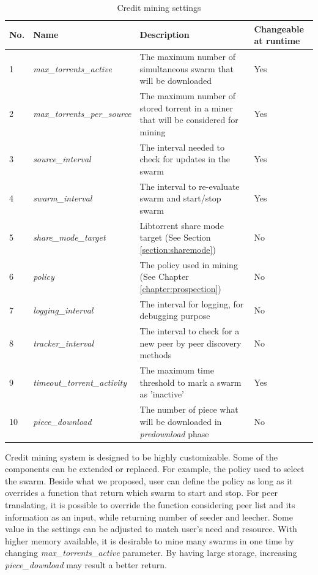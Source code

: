 \begin{table}[h]
	\centering
	\caption{Credit mining settings}
	\label{tbl:cmsettings}
	\begin{adjustwidth}{-1.5cm}{}
	\begin{tabular}{|p{1cm}|p{4cm}|p{7cm}|p{2cm}|}
		\hline
		\rowcolor[HTML]{EFEFEF} 
		No. & Name & Description & Changeable at runtime \\ \hline
	1 & \textit{max\_torrents\_active} & The maximum number of simultaneous swarm that will be downloaded & Yes \\ \hline
	2 & \textit{max\_torrents\_per\_source} & The maximum number of stored torrent in a miner that will be considered for mining & Yes \\ \hline
	3 & \textit{source\_interval} & The interval needed to check for updates in the swarm & Yes \\ \hline
	4 & \textit{swarm\_interval} & The interval to re-evaluate swarm and start/stop swarm & Yes \\ \hline
	5 & \textit{share\_mode\_target} & Libtorrent share mode target (See Section \ref{section:sharemode}) & No \\ \hline
	6 & \textit{policy} & The policy used in mining (See Chapter \ref{chapter:prospection}) & No \\ \hline
	7 & \textit{logging\_interval} & The interval for logging, for debugging purpose & No \\ \hline
	8 & \textit{tracker\_interval} & The interval to check for a new peer by peer discovery methods & No \\ \hline
	9 & \textit{timeout\_torrent\_activity} & The maximum time threshold to mark a swarm as 'inactive' & Yes \\ \hline
	10 & \textit{piece\_download} & The number of piece what will be downloaded in \textit{predownload} phase & No \\ \hline
	\end{tabular}
	\end{adjustwidth}
\end{table}

Credit mining system is designed to be highly customizable. Some of the components can be extended or replaced. For example, the policy used to select the swarm. Beside what we proposed, user can define the policy as long as it overrides a function that return which swarm to start and stop. For peer translating, it is possible to override the function considering peer list and its information as an input, while returning number of seeder and leecher. Some value in the settings can be adjusted to match user's need and resource. With higher memory available, it is desirable to mine many swarms in one time by changing \textit{max\_torrents\_active} parameter. By having large storage, increasing \textit{piece\_download} may result a better return.

